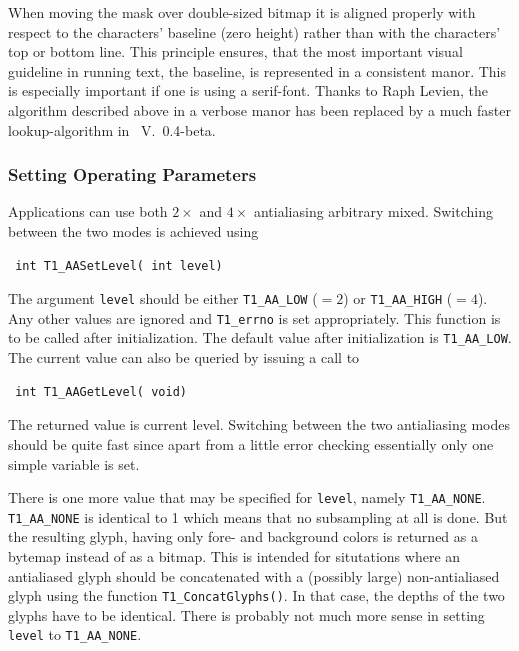 When moving the mask over double-sized bitmap it is aligned properly with
respect to the characters' baseline (zero height) rather than with the
characters' top or bottom line. This principle ensures, that the most important
visual guideline in running text, the baseline, is represented in a consistent
manor. This is especially important if one is using a serif-font.
Thanks to Raph Levien, the algorithm described above in a verbose manor has
been replaced by a much 
faster lookup-algorithm in \tonelib\ V.\ 0.4-beta.

\subsubsection{Setting Operating Parameters}
Applications can use both $2\times$ and $4\times$ antialiasing arbitrary
mixed. Switching between the two modes is achieved using
\precorr
\begin{verbatim}
 int T1_AASetLevel( int level)
\end{verbatim}\postcorr
The argument \verb+level+ should be either \verb+T1_AA_LOW+ ($=2$) or
\verb+T1_AA_HIGH+ ($=4$). Any other values are ignored and \verb+T1_errno+ is
set appropriately. This function is to be called after initialization. The
default value after initialization is \verb+T1_AA_LOW+. The current value can
also be queried by issuing a call to 
\precorr
\begin{verbatim}
 int T1_AAGetLevel( void)
\end{verbatim}\postcorr
The returned value is current level. Switching between the two antialiasing
modes should be quite fast since apart from a little error checking
essentially only one simple variable is set.

There is one more value that may be specified for \verb+level+, namely
\verb+T1_AA_NONE+. \verb+T1_AA_NONE+ is identical to 1 which means that no
subsampling at all is done. But the resulting glyph, having only fore- and
background colors is returned as a bytemap instead of as a bitmap. This is
intended for situtations where an antialiased glyph should be concatenated
with a (possibly large) non-antialiased glyph using the function
\verb+T1_ConcatGlyphs()+. In that case, the depths of the two glyphs have to
be identical. There is probably not much more sense in setting \verb+level+ to
\verb+T1_AA_NONE+.

